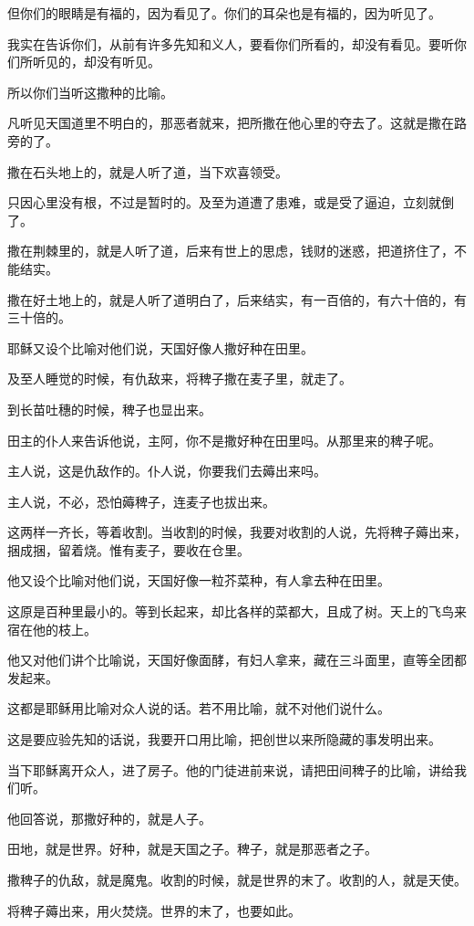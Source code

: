 \documentclass[12pt,oneside]{book}
\begin{document}
但你们的眼睛是有福的，因为看见了。你们的耳朵也是有福的，因为听见了。

我实在告诉你们，从前有许多先知和义人，要看你们所看的，却没有看见。要听你们所听见的，却没有听见。

所以你们当听这撒种的比喻。

凡听见天国道里不明白的，那恶者就来，把所撒在他心里的夺去了。这就是撒在路旁的了。

撒在石头地上的，就是人听了道，当下欢喜领受。

只因心里没有根，不过是暂时的。及至为道遭了患难，或是受了逼迫，立刻就倒了。

撒在荆棘里的，就是人听了道，后来有世上的思虑，钱财的迷惑，把道挤住了，不能结实。

撒在好土地上的，就是人听了道明白了，后来结实，有一百倍的，有六十倍的，有三十倍的。

耶稣又设个比喻对他们说，天国好像人撒好种在田里。

及至人睡觉的时候，有仇敌来，将稗子撒在麦子里，就走了。

到长苗吐穗的时候，稗子也显出来。

田主的仆人来告诉他说，主阿，你不是撒好种在田里吗。从那里来的稗子呢。

主人说，这是仇敌作的。仆人说，你要我们去薅出来吗。

主人说，不必，恐怕薅稗子，连麦子也拔出来。

这两样一齐长，等着收割。当收割的时候，我要对收割的人说，先将稗子薅出来，捆成捆，留着烧。惟有麦子，要收在仓里。

他又设个比喻对他们说，天国好像一粒芥菜种，有人拿去种在田里。

这原是百种里最小的。等到长起来，却比各样的菜都大，且成了树。天上的飞鸟来宿在他的枝上。

他又对他们讲个比喻说，天国好像面酵，有妇人拿来，藏在三斗面里，直等全团都发起来。

这都是耶稣用比喻对众人说的话。若不用比喻，就不对他们说什么。

这是要应验先知的话说，我要开口用比喻，把创世以来所隐藏的事发明出来。

当下耶稣离开众人，进了房子。他的门徒进前来说，请把田间稗子的比喻，讲给我们听。

他回答说，那撒好种的，就是人子。

田地，就是世界。好种，就是天国之子。稗子，就是那恶者之子。

撒稗子的仇敌，就是魔鬼。收割的时候，就是世界的末了。收割的人，就是天使。

将稗子薅出来，用火焚烧。世界的末了，也要如此。
\end{document}
